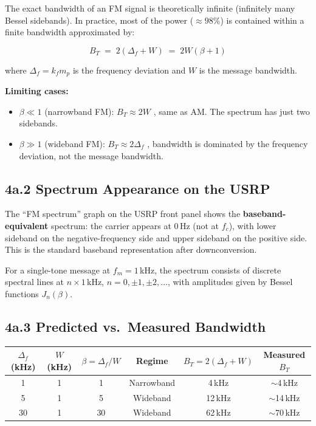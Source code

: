 \documentclass[../../main.tex]{subfiles}
\begin{document}
The exact bandwidth of an FM signal is theoretically infinite (infinitely many Bessel sidebands). In practice, most of the power ($\approx 98\%$) is contained within a finite bandwidth approximated by:

\[
\boxed{
  B_T \;=\; 2(\Delta_f + W) \;=\; 2W(\beta + 1)
}
\]

where $\Delta_f = k_f m_p$ is the frequency deviation and $W$ is the message bandwidth.

\textbf{Limiting cases:}
\begin{itemize}[leftmargin=1.5em]
  \item $\beta \ll 1$ (narrowband FM): $B_T \approx 2W$ , same as AM. The spectrum has just two sidebands.
  \item $\beta \gg 1$ (wideband FM): $B_T \approx 2\Delta_f$ , bandwidth is dominated by the frequency deviation, not the message bandwidth.
\end{itemize}

\vspace{0.5em}

\subsection{4a.2 \; Spectrum Appearance on the USRP}

The ``FM spectrum'' graph on the USRP front panel shows the \textbf{baseband-equivalent} spectrum: the carrier appears at 0\,Hz (not at $f_c$), with lower sideband on the negative-frequency side and upper sideband on the positive side. This is the standard baseband representation after downconversion.

For a single-tone message at $f_m = 1$\,kHz, the spectrum consists of discrete spectral lines at $n \times 1$\,kHz, $n = 0, \pm 1, \pm 2, \ldots$, with amplitudes given by Bessel functions $J_n(\beta)$.

\vspace{0.5em}

\subsection{4a.3 \; Predicted vs.\ Measured Bandwidth}

\begin{center}
\renewcommand{\arraystretch}{1.3}
\begin{tabular}{cccccc}
\toprule
$\Delta_f$ (kHz) & $W$ (kHz) & $\beta = \Delta_f / W$ & Regime & $B_T = 2(\Delta_f + W)$ & Measured $B_T$ \\
\midrule
1  & 1 & 1  & Narrowband & 4\,kHz  & $\sim$4\,kHz \\
5  & 1 & 5  & Wideband   & 12\,kHz & $\sim$14\,kHz \\
30 & 1 & 30 & Wideband   & 62\,kHz & $\sim$70\,kHz \\
\bottomrule
\end{tabular}
\end{center}
\end{document}
